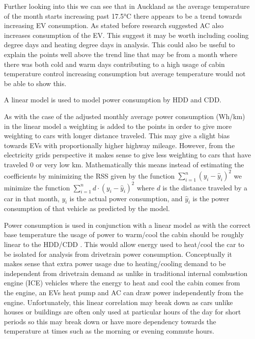 \documentclass[
]{article}
\begin{document}
Further looking into this we can see that in Auckland as the average
temperature of the month starts increasing past 17.5°C there appears to
be a trend towards increasing EV consumption. As stated before research
\cite{ev_range} suggested AC also increases consumption of the EV. This
suggest it may be worth including cooling degree days and heating degree
days in analysis. This could also be useful to explain the points well
above the trend line that may be from a month where there was both cold
and warm days contributing to a high usage of cabin temperature control
increasing consumption but average temperature would not be able to show
this.

A linear model is used to model power consumption by HDD and CDD.

As with the case of the adjusted monthly average power consumption
(Wh/km) in the linear model a weighting is added to the points in order
to give more weighting to cars with longer distance traveled. This may
give a slight bias towards EVs with proportionally higher highway
mileage. However, from the electricity grids perspective it makes sense
to give less weighting to cars that have traveled 0 or very low km.
Mathematically this means instead of estimating the coefficients by
minimizing the RSS given by the function
\(\sum_{i =1}^{n}(y_{i}-\hat{y}_{i})^2\) we minimize the function
\(\sum_{i =1}^{n}d \cdot(y_{i}-\hat{y}_{i})^2\) where \(d\) is the
distance traveled by a car in that month, \(y_{i}\) is the actual power
consumption, and \(\hat{y}_{i}\) is the power consumption of that
vehicle as predicted by the model.

Power consumption is used in conjunction with a linear model as with the
correct base temperature the usage of power to warm/cool the cabin
should be roughly linear to the HDD/CDD \cite{HDD_est}. This would allow
energy used to heat/cool the car to be isolated for analysis from
drivetrain power consumption. Conceptually it makes sense that extra
power usage due to heating/cooling demand to be independent from
drivetrain demand as unlike in traditional internal combustion engine
(ICE) vehicles where the energy to heat and cool the cabin comes from
the engine, an EVs heat pump and AC can draw power independently from
the engine. Unfortunately, this linear correlation may break down as
cars unlike houses or buildings are often only used at particular hours
of the day for short periods so this may break down or have more
dependency towards the temperature at times such as the morning or
evening commute hours.
\end{document}
